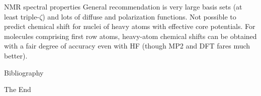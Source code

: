 \documentclass[aspectratio=169]{beamer}
\begin{document}
\begin{frame}{NMR spectral properties}
General recommendation is very large basis sets (at least triple-$\zeta$) and lots of diffuse and polarization functions.\newline
\newline
Not possible to predict chemical shift for nuclei of heavy atoms with effective core potentials.\newline
\newline
For molecules comprising first row atoms, heavy-atom chemical shifts can be obtained with a fair degree of accuracy even with HF (though MP2 and DFT fares much better).

\end{frame} 

\begin{frame}[allowframebreaks]{Bibliography}
    
    
\end{frame}



\begin{frame}
    \Huge{\centerline{The End}}
\end{frame}
\end{document}

